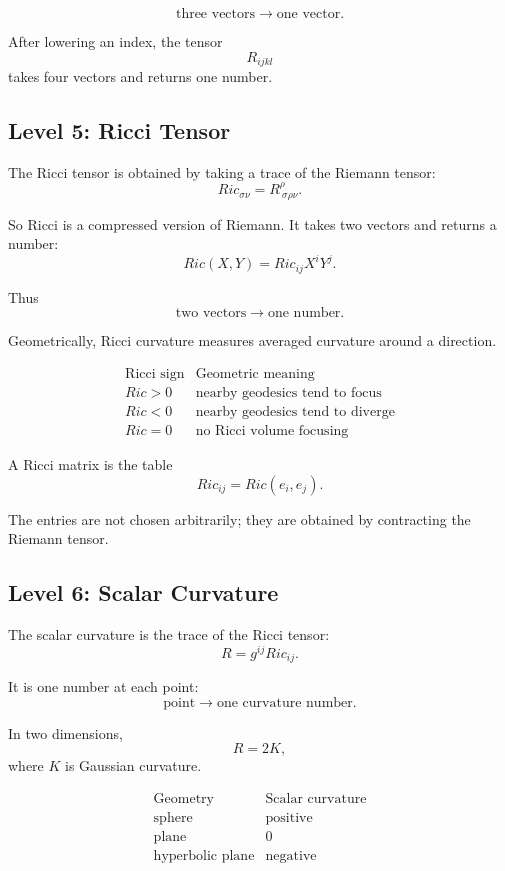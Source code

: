 \documentclass[12pt,a4paper]{article}
\theoremstyle{notespace}
\begin{document}
\[
\boxed{
	\text{three vectors}
	\longrightarrow
	\text{one vector}.
}
\]

After lowering an index, the tensor
\[
R_{ijkl}
\]
takes four vectors and returns one number.

\subsection{Level 5: Ricci Tensor}

The Ricci tensor is obtained by taking a trace of the Riemann tensor:
\[
Ric_{\sigma\nu}
=
R^\rho_{\ \sigma\rho\nu}.
\]

So Ricci is a compressed version of Riemann. It takes two vectors and returns a number:
\[
Ric(X,Y)=Ric_{ij}X^iY^j.
\]

Thus
\[
\boxed{
	\text{two vectors}
	\longrightarrow
	\text{one number}.
}
\]

Geometrically, Ricci curvature measures averaged curvature around a direction.

\[
\begin{array}{c|c}
	\text{Ricci sign} & \text{Geometric meaning}\\
	\hline
	Ric>0 & \text{nearby geodesics tend to focus}\\
	Ric<0 & \text{nearby geodesics tend to diverge}\\
	Ric=0 & \text{no Ricci volume focusing}
\end{array}
\]

A Ricci matrix is the table
\[
Ric_{ij}=Ric(e_i,e_j).
\]

The entries are not chosen arbitrarily; they are obtained by contracting the Riemann tensor.

\subsection{Level 6: Scalar Curvature}

The scalar curvature is the trace of the Ricci tensor:
\[
R=g^{ij}Ric_{ij}.
\]

It is one number at each point:
\[
\boxed{
	\text{point}
	\longrightarrow
	\text{one curvature number}.
}
\]

In two dimensions,
\[
R=2K,
\]
where \(K\) is Gaussian curvature.

\[
\begin{array}{c|c}
	\text{Geometry} & \text{Scalar curvature}\\
	\hline
	\text{sphere} & \text{positive}\\
	\text{plane} & 0\\
	\text{hyperbolic plane} & \text{negative}
\end{array}
\]
\end{document}
